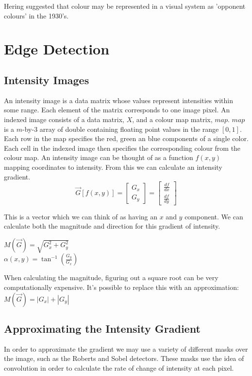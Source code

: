 \documentclass{article}
\begin{document}
	\par 
	Hering suggested that colour may be represented in a visual system as 'opponent colours' in the 1930's.
	
	
	\section{Edge Detection}
	\subsection{Intensity Images}
	An intensity image is a data matrix whose values represent intensities within some range. Each element of the matrix corresponds to one image pixel. An indexed image consists of a data matrix, $X$, and a colour map matrix, $map$. $map$ is a $m$-by-3 array of double containing floating point values in the range $[0, 1]$. Each row in the map specifies the red, green an blue components of a single color. Each cell in the indexed image then specifies the corresponding colour from the colour map. An intensity image can be thought of as a function $f(x, y)$ mapping coordinates to intensity. From this we can calculate an intensity gradient.
	\begingroup
	\renewcommand*{\arraystretch}{1.5}
	\[ \overrightarrow{G}[f(x,y)] = \begin{bmatrix}G_{x} \\ G_{y} \end{bmatrix} = \begin{bmatrix} \frac{df}{dx} \\ \frac{df}{dy} \end{bmatrix} \]	
	\endgroup

	 This is a vector which we can think of as having an $x$ and $y$ component. We can calculate both the magnitude and direction for this gradient of intensity. 
	\begin{multicols}{2}
		\noindent
		\centering
			$M(\overrightarrow{G}) = \sqrt{G_{x}^{2} + G_{y}^{2}}$ \\
			$\alpha(x, y) = \tan^{-1}\left(\frac{G_y}{G_x}\right)$
	\end{multicols}
	
	When calculating the magnitude, figuring out a square root can be very computationally expensive. It's possible to replace this with an approximation: $M(\overrightarrow{G}) = |G_{x}| + |G_{y}|$
	
	\subsection{Approximating the Intensity Gradient}
	In order to approximate the gradient we may use a variety of different masks over the image, such as the Roberts and Sobel detectors. These masks use the idea of convolution in order to calculate the rate of change of intensity at each pixel. 
	
\end{document}
